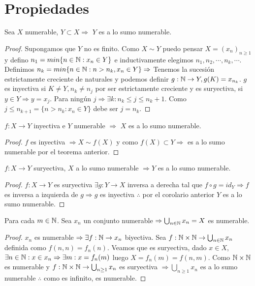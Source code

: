\section{Propiedades}

\begin{theorem}
    Sea $X$ numerable, $Y \subset X \Rightarrow$ $Y$ es a lo sumo numerable.
    \begin{proof}
        Supongamos que $Y$ no es finito. Como $X \sim Y$ puedo pensar $X = (x_n)_{n\geq1}$ y defino $n_1=min\{ n \in \mathbb{N}: x_n \in Y \}$ e inductivamente elegimos $n_1, n_2, \cdots , n_k, \cdots$. Definimos $n_k = min\{ n \in \mathbb{N} : n > n_k, x_n \in Y \} \Rightarrow$ Tenemos la sucesión estrictamente creciente de naturales y podemos definir $g: \mathbb{N} \to Y, g(K) = x_{n_k}$. $g$ es inyectiva si $K\neq Y, n_k \neq n_j$ por ser estrictamente creciente y es suryectiva, si $y \in Y \Rightarrow y = x_j$. Para ningún $j \Rightarrow \exists k :n_k\leq j \leq n_k+1$. Como $j \leq n_{k+1}=\{ n>n_k:x_n \in Y \}$ debe ser $j = n_k$.
    \end{proof}
\end{theorem}

\begin{corollary}
    $f: X \to Y$ inyectiva e $Y$ numerable $\Rightarrow$ $X$ es a lo sumo numerable. 
    \begin{proof}
        $f$ es inyectiva $\Rightarrow X \sim f(X)$ y como $f(X) \subset Y \Rightarrow$ es a lo sumo numerable por el teorema anterior.
    \end{proof}
\end{corollary}

\begin{theorem}
    $f: X \to Y$ suryectiva, $X$ a lo sumo numerable $\Rightarrow Y$ es a lo sumo numerable.
    \begin{proof}
        $f: X \to Y$ es suryectiva $\exists g: Y \to X$ inversa a derecha tal que $f \circ g = id_Y \Rightarrow f$ es inversa a izquierda de $g \Rightarrow g$ es inyectiva $\therefore$ por el corolario anterior $Y$ es a lo sumo numerable.
    \end{proof}
\end{theorem}

\begin{theorem}
    Para cada $m \in \mathbb{N}$. Sea $x_n$ un conjunto numerable $\Rightarrow \bigcup_{n \in \mathbb{N}}x_n = X$ es numerable.
    \begin{proof}
        $x_n$ es numerable $\Rightarrow \exists f:\mathbb{N} \to x_n$ biyectiva. Sea $f:\mathbb{N} \times \mathbb{N} \to \bigcup_{n \in \mathbb{N}} x_n $ definida como $f(n, n) = f_n(n)$. Veamos que es suryectiva, dado $x \in X$, $\exists n \in \mathbb{N}:x \in x_n \Rightarrow \exists m:x=f_n(m)$ luego $X=f_n(m) = f(n, m)$. Como $\mathbb{N} \times \mathbb{N}$ es numerable y $f: \mathbb{N} \times \mathbb{N} \to \bigcup_{n \geq 1}{x_n}$ es suryectiva $\Rightarrow \bigcup_{n \geq 1}x_n$ es a lo sumo numerable $\therefore$ como es infinito, es numerable.
    \end{proof}
\end{theorem}

